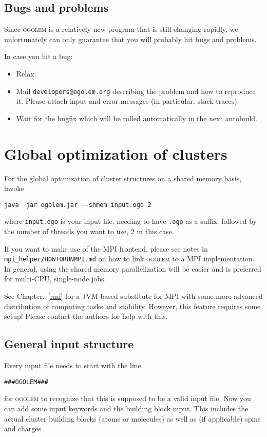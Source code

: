 \documentclass[a4paper,10pt]{scrbook}
\newcommand{\ogo}{\textsc{ogolem}}
\begin{document}
\section{Bugs and problems}
Since \ogo{} is a relatively new program that is still changing rapidly, we
unfortunately can only guarantee that you will probably hit bugs and problems.

In case you hit a bug:
\begin{itemize}
  \item Relax.
  \item Mail \texttt{developers@ogolem.org} describing the problem and how to 
reproduce it. Please attach input and error messages (in particular: stack 
traces).
  \item Wait for the bugfix which will be rolled automatically in the next 
autobuild.
\end{itemize}



\chapter{Global optimization of clusters}
For the global optimization of cluster structures on a shared memory basis,
invoke
\begin{verbatim}
java -jar ogolem.jar --shmem input.ogo 2
\end{verbatim}
where \texttt{input.ogo} is your input file, needing to have \texttt{.ogo} as a
suffix, followed by the number of threads you want to use, 2 in this case.

If you want to make use of the MPI frontend, please see notes in
\texttt{mpi\_helper/HOWTORUNMPI.md} on how to link \ogo{} to a MPI
implementation. In general, using the shared memory parallelization will be
easier and is preferred for multi-CPU, single-node jobs.

See Chapter.~\ref{rmi} for a JVM-based substitute for MPI with some more
advanced distribution of computing tasks and stability. However, this feature
requires some setup! Please contact the authors for help with this.

\section{General input structure}
Every input file needs to start with the line
\begin{verbatim}
###OGOLEM###
\end{verbatim}
for \ogo{} to recognize that this is supposed to be a valid input file. Now you
can add some input keywords and the building block input. This includes the
actual cluster building blocks (atoms or molecules) as well as (if applicable)
spins and charges.
\end{document}
